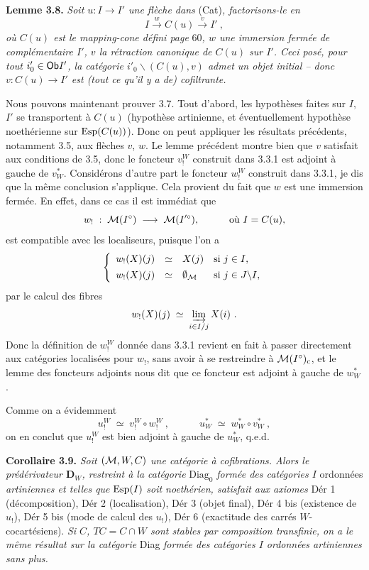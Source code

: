 \textbf{Lemme 3.8.} \textit{Soit $u : I\longrightarrow I'$ une flèche dans} (Cat)\textit{, factorisons-le en}
\[
I \xrightarrow{\;w\;} C(u) \xrightarrow{\;v\;} I'\ ,
\]
\textit{où $C(u)$ est le mapping-cone défini page} 60\textit{, $w$ une immersion fermée de complémentaire $I'$, $v$ la rétraction canonique de $C(u)$ sur $I'$. Ceci posé, pour tout $i'_0\in\mathsf{Ob} I'$, la catégorie $i'_0\backslash(C(u),v)$ admet un objet initial – donc $v : C(u)\longrightarrow I'$ est (tout ce qu'il y a de) cofiltrante.}

Nous pouvons maintenant prouver 3.7. Tout d'abord, les hypothèses faites sur $I$, $I'$ se transportent à $C(u)$ (hypothèse artinienne, et éventuellement hypothèse noethérienne sur $\operatorname{Esp}(C(u))$). Donc
on peut appliquer les résultats précédents, notamment 3.5, aux flèches $v$, $w$. Le lemme précédent montre bien que $v$ satisfait aux conditions de 3.5, donc le foncteur $v_!^W$ construit dans 3.3.1 est adjoint à gauche de $v_W^*$. Considérons d'autre part le foncteur $w_!^W$ construit dans 3.3.1, je dis que la même conclusion s'applique. Cela provient du fait que $w$ est une immersion fermée. En effet, dans ce cas il est immédiat que
\[
w_! \;:\; \M(I^\circ) \;\longrightarrow\; \M(I'^\circ), \qquad\quad \text{où } I = C(u), %
\]
est compatible avec les localiseurs, puisque l'on a
\[
\left\{
\begin{array}{lcll}
w_!(X)(j) & \simeq & X(j) & \text{si } j\in I,\\[1ex]
w_!(X)(j) & \simeq & \emptyset_{\mathcal{M}} & \text{si } j\in J\backslash I,
\end{array}
\right.
\]
par le calcul des fibres
\[
w_!(X)(j) \;\simeq\; \varinjlim_{i\in I/j} X(i)\ .
\]
Donc la définition de $w_!^W$ donnée dans 3.3.1 revient en fait à passer directement aux catégories localisées pour $w_!$, sans avoir à se restreindre à $\mathcal{M}(I^\circ)_{\mathrm{c}}$, et le lemme des foncteurs adjoints nous dit que
ce foncteur est adjoint à gauche de $w_W^*$.

Comme on a évidemment
\[
u_!^W \;\simeq\; v_!^W\circ w_!^W\ , \qquad\quad u_W^* \;\simeq\; w_W^*\circ v_W^*\ ,
\]
on en conclut que $u_!^W$ est bien adjoint à gauche de $u_W^*$, q.e.d.

\textbf{Corollaire 3.9.} \textit{Soit $(\mathcal{M},W,C)$ une catégorie à cofibrations. Alors le prédérivateur $\mathbf{D}_W$, restreint à la catégorie} $\mathrm{Diag}_0$ \textit{formée des catégories $I$} ordonnées \textit{artiniennes et telles que} $\operatorname{Esp}(I)$ \textit{soit noethérien, satisfait aux axiomes} Dér 1 (décomposition), Dér 2 (localisation), Dér 3 (objet final), Dér 4 bis (existence de $u_!$), Dér 5 bis (mode de calcul des $u_!$), Dér 6 (exactitude des carrés $W$-cocartésiens). \textit{Si $C$, $TC = C\cap W$ sont stables par composition transfinie, on a le même résultat sur la catégorie} Diag \textit{formée des catégories $I$ ordonnées artiniennes sans plus.}


